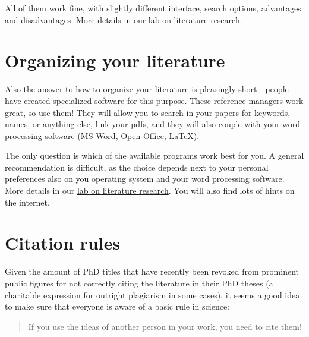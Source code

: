 \documentclass{tufte-book}
\begin{document}
All of them work fine, with slightly different interface, search options, advantages and disadvantages. More details in our \href{https://github.com/florianhartig/ResearchSkills/tree/master/Labs/LiteratureResearch}{lab on literature research}. 

\section{Organizing your literature}

Also the answer to how to organize your literature is pleasingly short - people have created specialized software for this purpose. These reference managers work great, so use them! They will allow you to search in your papers for keywords, names, or anything else, link your pdfs, and they will also couple with your word processing software (MS Word, Open Office, LaTeX). 


The only question is which of the available programs work best for you. A general recommendation is difficult, as the choice depends next to your personal preferences also on you operating system and your word processing software. More details in our \href{https://github.com/florianhartig/ResearchSkills/tree/master/Labs/LiteratureResearch}{lab on literature research}. You will also find lots of hints on the internet. 

\section{Citation rules}

Given the amount of PhD titles that have recently been revoked from prominent public figures for not correctly citing the literature in their PhD theses (a charitable expression for outright plagiarism in some cases), it seems a good idea to make sure that everyone is aware of a basic rule in science:

\begin{quote}
If you use the ideas of another person in your work, you need to cite them!
\end{quote}
\end{document}
